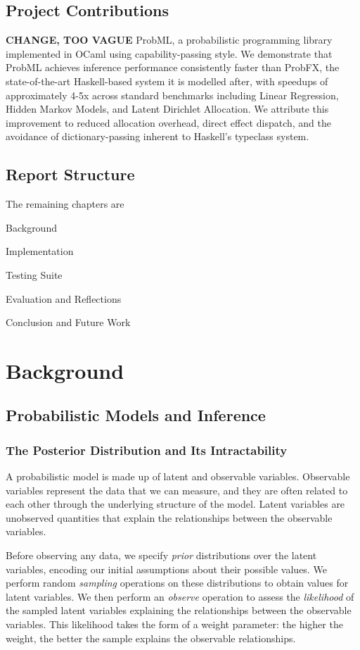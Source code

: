 \documentclass[logo,bsc,singlespacing,parskip,online]{infthesis}
\begin{document}
\section{Project Contributions}

\textbf{CHANGE, TOO VAGUE}
ProbML, a probabilistic programming library implemented in OCaml using capability-passing style. We demonstrate that ProbML achieves inference performance consistently faster than ProbFX, the state-of-the-art Haskell-based system it is modelled after, with speedups of approximately 4-5x across standard benchmarks including Linear Regression, Hidden Markov Models, and Latent Dirichlet Allocation. We attribute this improvement to reduced allocation overhead, direct effect dispatch, and the avoidance of dictionary-passing inherent to Haskell's typeclass system.

\section{Report Structure}

The remaining chapters are 

Background

Implementation

Testing Suite

Evaluation and Reflections

Conclusion and Future Work

\chapter{Background}

\section{Probabilistic Models and Inference}

\subsection{The Posterior Distribution and Its Intractability}

A probabilistic model is made up of latent and observable variables. Observable variables represent the data that we can measure, and they are often related to each other through the underlying structure of the model. Latent variables are unobserved quantities that explain the relationships between the observable variables.

Before observing any data, we specify \textit{prior} distributions over the latent variables, encoding our initial assumptions about their possible values. We perform random \textit{sampling} operations on these distributions to obtain values for latent variables. We then perform an \textit{observe} operation to assess the \textit{likelihood} of the sampled latent variables explaining the relationships between the observable variables. This likelihood takes the form of a weight parameter: the higher the weight, the better the sample explains the observable relationships.
\end{document}
